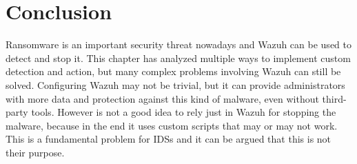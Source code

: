 \section{Conclusion}
Ransomware is an important security threat nowadays and Wazuh can be used to detect and stop it.
This chapter has analyzed multiple ways to implement custom detection and action, but many complex problems involving Wazuh can still be solved.
Configuring Wazuh may not be trivial, but it can provide administrators with more data and protection against this kind of malware, even without third-party tools.
\linej
However is not a good idea to rely just in Wazuh for stopping the malware, because in the end it uses custom scripts that may or may not work.
This is a fundamental problem for IDSs and it can be argued that this is not their purpose.
